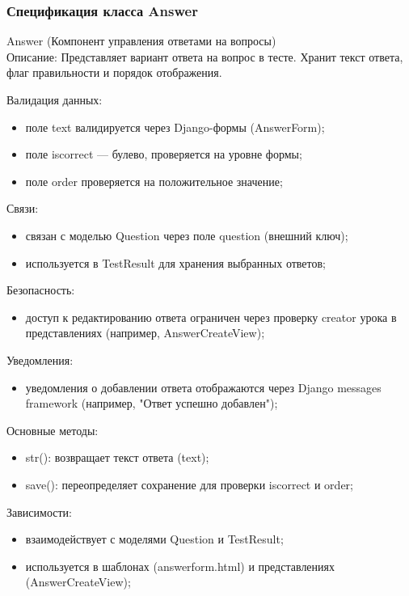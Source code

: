 \subsubsection{Спецификация класса Answer}
Answer (Компонент управления ответами на вопросы) \\
Описание: Представляет вариант ответа на вопрос в тесте. Хранит текст ответа, флаг правильности и порядок отображения.

Валидация данных: 
\begin{itemize}
	\item поле text валидируется через Django-формы (AnswerForm); 
	\item поле iscorrect — булево, проверяется на уровне формы; 
	\item поле order проверяется на положительное значение; 
\end{itemize}

Связи: 
\begin{itemize}
	\item связан с моделью Question через поле question (внешний ключ); 
	\item используется в TestResult для хранения выбранных ответов; 
\end{itemize}

Безопасность: 
\begin{itemize}
	\item доступ к редактированию ответа ограничен через проверку creator урока в представлениях (например, AnswerCreateView); 
\end{itemize}

Уведомления: 
\begin{itemize}
	\item уведомления о добавлении ответа отображаются через Django messages framework (например, "Ответ успешно добавлен"); 
\end{itemize}

Основные методы: 
\begin{itemize}
	\item str(): возвращает текст ответа (text); 
	\item save(): переопределяет сохранение для проверки iscorrect и order; 
\end{itemize}

Зависимости: 
\begin{itemize}
	\item взаимодействует с моделями Question и TestResult; 
	\item используется в шаблонах (answerform.html) и представлениях (AnswerCreateView); 
\end{itemize}

